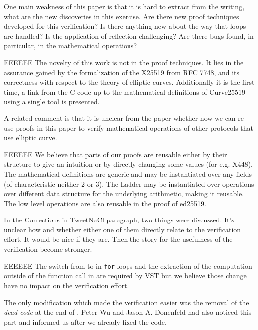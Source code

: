 One main weakness of this paper is that it is hard to extract
from the writing, what are the new discoveries in this
exercise. Are there new proof techniques developed for this
verification? Is there anything new about the way that loops
are handled? Is the application of reflection challenging? Are
there bugs found, in particular, in the mathematical operations?

\begin{answer}{EEEEEE}
  The novelty of this work is not in the proof techniques. It
  lies in the assurance gained by the formalization of the
  X25519 from RFC 7748, and its correctness with respect to
  the theory of elliptic curves. Additionally it is the first
  time, a link from the C code up to the mathematical definitions of
  Curve25519 using a single tool is presented.
\end{answer}

A related comment is that it is unclear from the paper
whether now we can re-use proofs in this paper to verify
mathematical operations of other protocols that use elliptic
curve.

\begin{answer}{EEEEEE}
  We believe that parts of our proofs are reusable either by
  their structure to give an intuition or by directly changing
  some values (for e.g. X448). The mathematical definitions
  are generic and may be instantiated over any fields (of characteristic
  neither 2 or 3). The Ladder may be instantiated
  over operations over different data structure for the underlying
  arithmetic, making it reusable. The low level operations
  \eg {} are also reusable in the proof of ed25519.
\end{answer}

In the Corrections in TweetNaCl paragraph, two things
were discussed. It’s unclear how and whether either one of
them directly relate to the verification effort. It would be nice
if they are. Then the story for the usefulness of the verification
become stronger.

\begin{answer}{EEEEEE}
  The switch from  to  in \texttt{for} loops and the
  extraction of the computation outside of the function call in
   are required by VST but we believe those
  change have no impact on the verification effort.

  The only modification which made the verification easier
  was the removal of the \textit{dead code} at the end of
  . Peter Wu and Jason A.
  Donenfeld had also noticed this part and informed us after we
  already fixed the code.
\end{answer}

